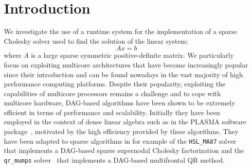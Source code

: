 \documentclass{article}
\begin{document}
\newpage
\setcounter{page}{1}

\section{Introduction} \label{sec:introduction} 



We investigate the use of a runtime system for the implementation of a
sparse Cholesky solver used to find the solution of the linear system:
\begin{equation}\label{eq:linear-system}
  Ax = b
\end{equation}
where $A$ is a large sparse symmetric positive-definite matrix. We
particularly focus on exploiting multicore architectures that have
become increasingly popular since their introduction and can be found
nowadays in the vast majority of high performance computing
platforms. Despite their popularity, exploiting the capabilities of
multicore processors remains a challenge and to cope with multicore
hardware, DAG-based algorithms have been shown to be extremely
efficient in terms of performance and scalability. Initially they have
been employed in the context of dense linear algebra such as in the
PLASMA software package~\cite{a.d.d.h.ea:09}, motivated by the high
efficiency provided by these algorithms. They have been adapted to
sparse algorithms in for example of the \texttt{HSL\_MA87}
solver~\cite{h.r.s:10} that implements a DAG-based sparse supernodal
Cholesky factorization and the \texttt{qr\_mumps} solver~\cite{b:13}
that implements a DAG-based multifrontal QR method.
\end{document}
